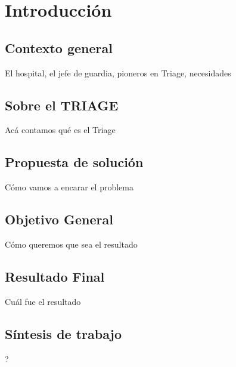 \section{Introducción}
\subsection{Contexto general}
El hospital, el jefe de guardia, pioneros en Triage, necesidades
\subsection{Sobre el TRIAGE}
Acá contamos qué es el Triage
\subsection{Propuesta de solución}
Cómo vamos a encarar el problema
\subsection{Objetivo General}
Cómo queremos que sea el resultado
\subsection{Resultado Final}
Cuál fue el resultado
\subsection{Síntesis de trabajo}
?